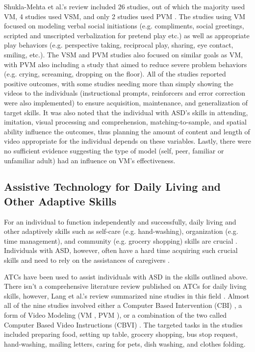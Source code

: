 Shukla-Mehta et al.'s review included 26 studies, out of which the majority used VM, 4 studies used VSM, and only 2 studies used PVM \cite{shukla2009evaluating}.  The studies using VM focused on modeling verbal social initiations (e.g. compliments, social greetings, scripted and unscripted verbalization for pretend play etc.) as well as appropriate play behaviors (e.g. perspective taking, reciprocal play, sharing, eye contact, smiling, etc.).  The VSM and PVM studies also focused on similar goals as VM, with PVM also including a study that aimed to reduce severe problem behaviors (e.g. crying, screaming, dropping on the floor).  All of the studies reported positive outcomes, with some studies needing more than simply showing the videos to the individuals (instructional prompts, reinforcers and error correction were also implemented) to ensure acquisition, maintenance, and generalization of target skills.  It was also noted that the individual with ASD's skills in attending, imitation, visual processing and comprehension, matching-to-sample, and spatial ability influence the outcomes, thus planning the amount of content and length of video appropriate for the individual depends on these variables.  Lastly, there were no sufficient evidence suggesting the type of model (self, peer, familiar or unfamiliar adult) had an influence on VM's effectiveness.

\subsection{Assistive Technology for Daily Living and Other Adaptive Skills}
For an individual to function independently and successfully, daily living and other adaptively skills such as self-care (e.g. hand-washing), organization (e.g. time management), and community (e.g. grocery shopping) skills are crucial \cite{liss2001predictors}.  Individuals with ASD, however, often have a hard time acquiring such crucial skills and need to rely on the assistances of caregivers \cite{smith2012developmental}.

ATCs have been used to assist individuals with ASD in the skills outlined above.  There isn't a comprehensive literature review published on ATCs for daily living skills, however, Lang et al.'s review summarized nine studies in this field \cite{lang2014assistive}.  Almost all of the nine studies involved either a Computer Based Intervention (CBI) \cite{hutcherson2004computer}, a form of Video Modeling (VM \cite{rosenberg2010evaluating}, PVM \cite{bereznak2012video, shipley2002teaching, sigafoos2007evaluation, sigafoos2005computer, van2010comparison}), or a combination of the two called Computer Based Video Instructions (CBVI) \cite{ayres2009acquisition, mechling2010computer}.  The targeted tasks in the studies included preparing food, setting up table, grocery shopping, bus stop request, hand-washing, mailing letters, caring for pets, dish washing, and clothes folding.

